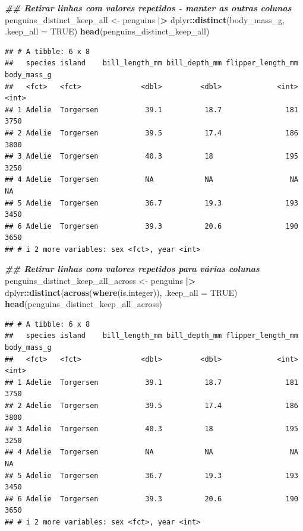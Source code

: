 \documentclass[
]{article}
\newenvironment{Shaded}{\begin{snugshade}}{\end{snugshade}}
\newcommand{\AttributeTok}[1]{\textcolor[rgb]{0.13,0.29,0.53}{#1}}
\newcommand{\ConstantTok}[1]{\textcolor[rgb]{0.56,0.35,0.01}{#1}}
\newcommand{\DocumentationTok}[1]{\textcolor[rgb]{0.56,0.35,0.01}{\textbf{\textit{#1}}}}
\newcommand{\FunctionTok}[1]{\textcolor[rgb]{0.13,0.29,0.53}{\textbf{#1}}}
\newcommand{\NormalTok}[1]{#1}
\newcommand{\OtherTok}[1]{\textcolor[rgb]{0.56,0.35,0.01}{#1}}
\newcommand{\SpecialCharTok}[1]{\textcolor[rgb]{0.81,0.36,0.00}{\textbf{#1}}}
\begin{document}
\begin{Shaded}
\begin{Highlighting}[]
\DocumentationTok{\#\# Retirar linhas com valores repetidos {-} manter as outras colunas}
\NormalTok{penguins\_distinct\_keep\_all }\OtherTok{\textless{}{-}}\NormalTok{ penguins }\SpecialCharTok{|\textgreater{}} 
\NormalTok{    dplyr}\SpecialCharTok{::}\FunctionTok{distinct}\NormalTok{(body\_mass\_g, }\AttributeTok{.keep\_all =} \ConstantTok{TRUE}\NormalTok{)}
\FunctionTok{head}\NormalTok{(penguins\_distinct\_keep\_all)}
\end{Highlighting}
\end{Shaded}

\begin{verbatim}
## # A tibble: 6 x 8
##   species island    bill_length_mm bill_depth_mm flipper_length_mm body_mass_g
##   <fct>   <fct>              <dbl>         <dbl>             <int>       <int>
## 1 Adelie  Torgersen           39.1          18.7               181        3750
## 2 Adelie  Torgersen           39.5          17.4               186        3800
## 3 Adelie  Torgersen           40.3          18                 195        3250
## 4 Adelie  Torgersen           NA            NA                  NA          NA
## 5 Adelie  Torgersen           36.7          19.3               193        3450
## 6 Adelie  Torgersen           39.3          20.6               190        3650
## # i 2 more variables: sex <fct>, year <int>
\end{verbatim}

\begin{Shaded}
\begin{Highlighting}[]
\DocumentationTok{\#\# Retirar linhas com valores repetidos para várias colunas}
\NormalTok{penguins\_distinct\_keep\_all\_across }\OtherTok{\textless{}{-}}\NormalTok{ penguins }\SpecialCharTok{|\textgreater{}} 
\NormalTok{    dplyr}\SpecialCharTok{::}\FunctionTok{distinct}\NormalTok{(}\FunctionTok{across}\NormalTok{(}\FunctionTok{where}\NormalTok{(is.integer)), }\AttributeTok{.keep\_all =} \ConstantTok{TRUE}\NormalTok{)}
\FunctionTok{head}\NormalTok{(penguins\_distinct\_keep\_all\_across)}
\end{Highlighting}
\end{Shaded}

\begin{verbatim}
## # A tibble: 6 x 8
##   species island    bill_length_mm bill_depth_mm flipper_length_mm body_mass_g
##   <fct>   <fct>              <dbl>         <dbl>             <int>       <int>
## 1 Adelie  Torgersen           39.1          18.7               181        3750
## 2 Adelie  Torgersen           39.5          17.4               186        3800
## 3 Adelie  Torgersen           40.3          18                 195        3250
## 4 Adelie  Torgersen           NA            NA                  NA          NA
## 5 Adelie  Torgersen           36.7          19.3               193        3450
## 6 Adelie  Torgersen           39.3          20.6               190        3650
## # i 2 more variables: sex <fct>, year <int>
\end{verbatim}
\end{document}
